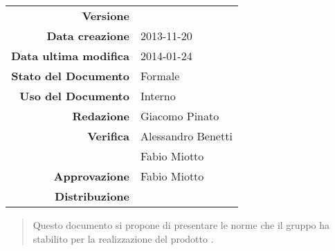 



\newcommand{\Versione}{\versioneNormeDiProgetto{}}	%
\newcommand{\Data}{2013-11-20}						%
\newcommand{\DataUltimaModifica}{2014-01-24}
\newcommand{\TipoDocumento}{Norme di Progetto}		%



\begin{center}
\begin{tabular}{r|l}
\textbf{Versione} & \Versione{} \\
\textbf{Data creazione} & \Data{} \\
\textbf{Data ultima modifica} & \DataUltimaModifica{} \\
\textbf{Stato del Documento} & Formale \\		%
\textbf{Uso del Documento} & Interno \\			%
\textbf{Redazione} & Giacomo Pinato\\			%
\textbf{Verifica} & Alessandro Benetti \\
& Fabio Miotto\\			%
\textbf{Approvazione} & Fabio Miotto \\			%
\textbf{Distribuzione} & \parbox[t]{4cm}{\NomeGruppo{}}\\
\end{tabular}
\end{center}

\vspace{0.05in}

\begin{abstract}
\begin{center}
Questo documento si propone di presentare le norme che il gruppo \NomeGruppo{} ha stabilito per la realizzazione del prodotto \Progetto{}.
\end{center}
\end{abstract}

